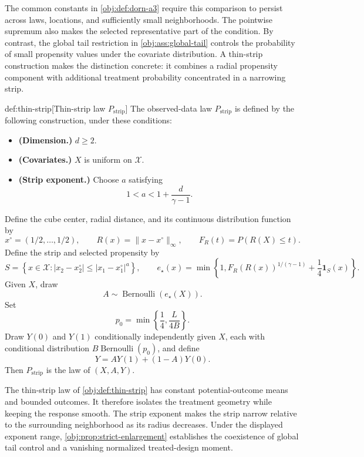 The common constants in \cref{obj:def:dorn-a3} require this comparison to persist across laws, locations, and sufficiently small neighborhoods. The pointwise supremum also makes the selected representative part of the condition. By contrast, the global tail restriction in \cref{obj:ass:global-tail} controls the probability of small propensity values under the covariate distribution. A thin-strip construction makes the distinction concrete: it combines a radial propensity component with additional treatment probability concentrated in a narrowing strip.

\begin{definitionv}{def:thin-strip}[Thin-strip law $P_{\mathrm{strip}}$]
The observed-data law \(P_{\mathrm{strip}}\) is defined by the following construction, under these conditions:
\begin{itemize}
\item \textbf{(Dimension.)} \(d\ge2\).
\item \textbf{(Covariates.)} \(X\) is uniform on \(\mathcal X\).
\item \textbf{(Strip exponent.)} Choose \(a\) satisfying
\[
1<a<1+\frac{d}{\gamma-1}.
\]
\end{itemize}
Define the cube center, radial distance, and its continuous distribution function by
\[
x^\circ=(1/2,\ldots,1/2),
\qquad
R(x)=\|x-x^\circ\|_\infty,
\qquad
F_R(t)=P(R(X)\le t).
\]
Define the strip and selected propensity by
\[
S=\left\{x\in\mathcal X:
|x_2-x_2^\circ|\le |x_1-x_1^\circ|^a\right\},
\qquad
e_\star(x)=
\min\left\{1,F_R(R(x))^{1/(\gamma-1)}
+\frac14\mathbf 1_S(x)\right\}.
\]
Given \(X\), draw
\[
A\sim\operatorname{Bernoulli}(e_\star(X)).
\]
Set
\[
p_0=\min\left\{\frac14,\frac{L}{4B}\right\}.
\]
Draw \(Y(0)\) and \(Y(1)\) conditionally independently given \(X\), each with conditional distribution \(B\operatorname{Bernoulli}(p_0)\), and define
\[
Y=AY(1)+(1-A)Y(0).
\]
Then \(P_{\mathrm{strip}}\) is the law of \((X,A,Y)\).
\end{definitionv}

The thin-strip law  of \cref{obj:def:thin-strip} has constant potential-outcome means and bounded outcomes. It therefore isolates the treatment geometry while keeping the response smooth. The strip exponent makes the strip narrow relative to the surrounding neighborhood as its radius decreases. Under the displayed exponent range, \cref{obj:prop:strict-enlargement} establishes the coexistence of global tail control and a vanishing normalized treated-design moment.

